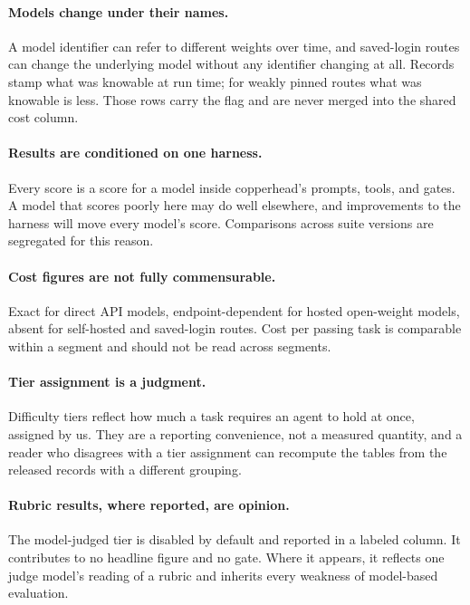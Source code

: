 \paragraph{Models change under their names.} A model identifier can refer to different weights over time, and saved-login routes can change the underlying model without any identifier changing at all. Records stamp what was knowable at run time; for weakly pinned routes what was knowable is less. Those rows carry the flag and are never merged into the shared cost column.

\paragraph{Results are conditioned on one harness.} Every score is a score for a model inside copperhead's prompts, tools, and gates. A model that scores poorly here may do well elsewhere, and improvements to the harness will move every model's score. Comparisons across suite versions are segregated for this reason.

\paragraph{Cost figures are not fully commensurable.} Exact for direct API models, endpoint-dependent for hosted open-weight models, absent for self-hosted and saved-login routes. Cost per passing task is comparable within a segment and should not be read across segments.

\paragraph{Tier assignment is a judgment.} Difficulty tiers reflect how much a task requires an agent to hold at once, assigned by us. They are a reporting convenience, not a measured quantity, and a reader who disagrees with a tier assignment can recompute the tables from the released records with a different grouping.

\paragraph{Rubric results, where reported, are opinion.} The model-judged tier is disabled by default and reported in a labeled column. It contributes to no headline figure and no gate. Where it appears, it reflects one judge model's reading of a rubric and inherits every weakness of model-based evaluation.

